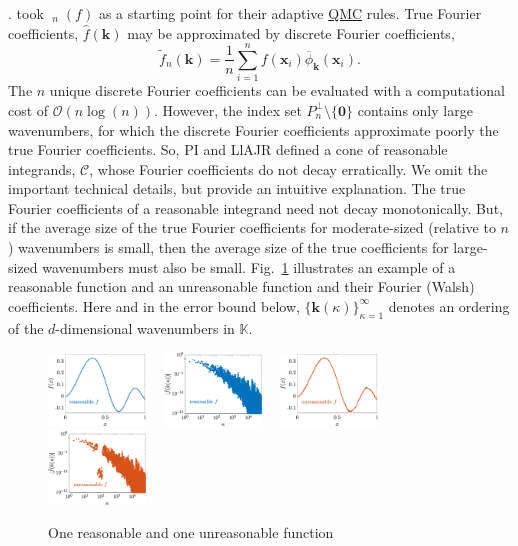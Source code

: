 \documentclass[11pt]{NSFamsart}
\newcommand{\QMC}{\hyperlink{QMClink}{QMC}\xspace}
\newcommand{\hf}{\widehat{f}}
\newcommand{\tf}{\widetilde{f}}
\newcommand{\bbK}{\mathbb{K}}
\DeclareMathOperator{\err}{err}
\DeclareMathOperator{\oerr}{\overline{\err}}
\newcommand{\bzero}{\boldsymbol{0}}
\newcommand{\bx}{{\boldsymbol{x}}}
\newcommand{\bk}{{\boldsymbol{k}}}
\newcommand{\cc}{\mathcal{C}}
\newcommand{\Order}{\mathcal{O}}
\begin{document}
. took $\oerr_n(f)$ as a starting point for their 
adaptive \QMC rules.   True Fourier 
coefficients, $\hf(\bk)$ may be approximated 
by discrete Fourier coefficients,
\begin{equation*}
\tf_n(\bk)  = \frac{1}n \sum_{i=1}^{n} f(\bx_i) \overline{\phi}_{\bk}(\bx_i).
\end{equation*}
The $n$ unique discrete Fourier coefficients can be evaluated with a computational cost of 
$\Order(n \log(n))$.  However, the index set $P^\perp_n \setminus\{\bzero\}$ contains only large 
wavenumbers, for which the discrete Fourier coefficients approximate poorly the true Fourier 
coefficients.  So, PI and LlAJR defined a cone of reasonable integrands, $\cc$, 
whose Fourier coefficients do not decay erratically.  We omit the important technical details, but 
provide an intuitive explanation.  The true Fourier coefficients of a reasonable integrand
need not decay monotonically.  But, if the average size of the true Fourier coefficients for 
moderate-sized (relative to $n$) wavenumbers is small, then the average size of the true 
coefficients for large-sized wavenumbers must also be small.  Fig.\ \ref{GoodBadWalshFig} 
illustrates an example of a reasonable function and an unreasonable function and their Fourier 
(Walsh) coefficients.  Here and in the error bound below, $\{\bk(\kappa)\}_{\kappa = 1}^\infty$ 
denotes an ordering of 
the $d$-dimensional wavenumbers in $\bbK$.

\begin{figure}[h]
	\centering
	\includegraphics[width = 0.23\textwidth] 
	{ProgramsImages/FunctionWalshFourierCoeffDecay.eps} \ \ 
	\includegraphics[width = 0.23\textwidth] 
	{ProgramsImages/WalshFourierCoeffDecay128.eps} \ \ 
	\includegraphics[width = 0.23\textwidth] 
	{ProgramsImages/FilteredFunctionWalshFourierCoeffDecay.eps} \ \ 
	\includegraphics[width = 0.23\textwidth] 
	{ProgramsImages/WalshFourierCoeffDecayFilter.eps}
	\caption{One reasonable and one unreasonable function 
	\label{GoodBadWalshFig}}
\end{figure}
\end{document}
